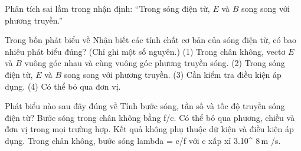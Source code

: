 \begin{bt}
Phân tích sai lầm trong nhận định: “Trong sóng điện từ, $E$ và $B$ song song với phương truyền.”
\end{bt}

\begin{ex}
Trong bốn phát biểu về Nhận biết các tính chất cơ bản của sóng điện từ, có bao nhiêu phát biểu đúng? (Chỉ ghi một số nguyên.) (1) Trong chân không, vectơ $E$ và $B$ vuông góc nhau và cùng vuông góc phương truyền sóng. (2) Trong sóng điện từ, $E$ và $B$ song song với phương truyền. (3) Cần kiểm tra điều kiện áp dụng. (4) Có thể bỏ qua đơn vị.
\end{ex}

\begin{ex}
Phát biểu nào sau đây đúng về Tính bước sóng, tần số và tốc độ truyền sóng điện từ?
\choice
{Bước sóng trong chân không bằng f/c.}
{Có thể bỏ qua phương, chiều và đơn vị trong mọi trường hợp.}
{Kết quả không phụ thuộc dữ kiện và điều kiện áp dụng.}
{\True Trong chân không, bước sóng lambda = c/f với c xấp xỉ 3.10^ $8\,\text{m}$ /s.}
\end{ex}

